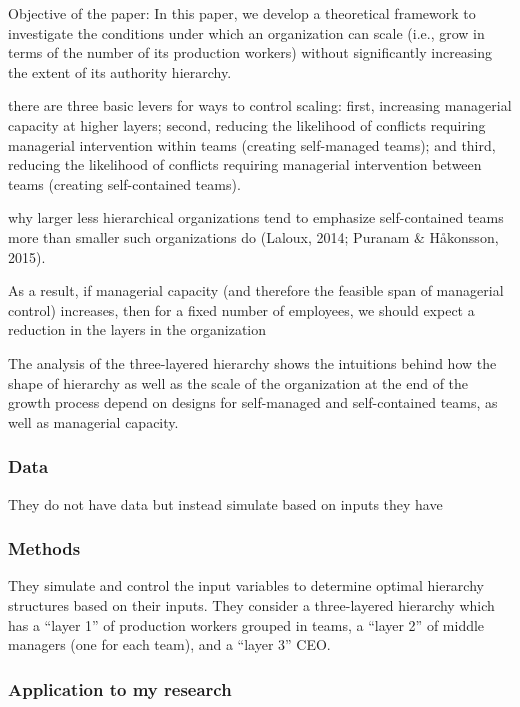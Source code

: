 \documentclass[12pt]{article}
\begin{document}
Objective of the paper:  In this paper, we develop a theoretical framework to investigate the conditions under which an organization can scale (i.e., grow in terms of the number of its production workers) without significantly increasing the extent of its authority hierarchy.

there are three basic levers for ways to control scaling: first, increasing managerial capacity at higher layers; second, reducing the likelihood of conflicts requiring managerial intervention within teams (creating self-managed teams); and third, reducing the likelihood of conflicts requiring managerial intervention between teams (creating self-contained teams).

why larger less hierarchical organizations tend to emphasize self-contained teams more than smaller such organizations do (Laloux, 2014; Puranam \& Håkonsson, 2015).

As a result, if managerial capacity (and therefore the feasible span of managerial control) increases, then for a fixed number of employees, we should expect a reduction in the layers in the organization

The analysis of the three-layered hierarchy shows the intuitions behind how the shape of hierarchy as well as the scale of the organization at the end of the growth process depend on designs for self-managed and self-contained teams, as well as managerial capacity.


\subsubsection*{Data}

They do not have data but instead simulate based on inputs they have

\subsubsection*{Methods}

They simulate and control the input variables to determine optimal hierarchy structures based on their inputs. They consider a three-layered hierarchy which has a “layer 1” of production workers grouped in teams, a “layer 2” of middle managers (one for each team), and a “layer 3” CEO.

\subsubsection*{Application to my research}
\end{document}
